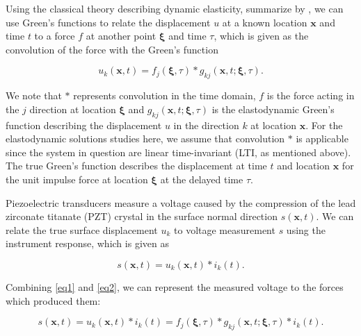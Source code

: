\documentclass[preprint,3p, 11pt,authoryear]{elsarticle}
\begin{document}
Using the classical theory describing dynamic elasticity, summarize by \citet{Aki2002}, we can use Green's functions to relate the displacement $u$ at a known location $\mathbf{x}$ and time $t$ to a force $f$ at another point $\mathbf{\xi}$ and time $\tau$, which is given as the convolution of the force with the Green's function

\begin{equation}
\label{eq1}
           u_{k}\left( \mathbf{x}, t \right)  =  
            f_{j}\left( \mathbf{\xi}, \tau \right) \ast 
            g_{kj}\left( \mathbf{x}, t;\mathbf{\xi}, \tau \right).
\end{equation}

\noindent We note that $\ast$ represents convolution in the time domain, $f$ is the force acting in the $j$ direction at location $\mathbf{\xi}$ and $g_{kj}\left( \mathbf{x}, t;\mathbf{\xi}, \tau \right)$ is the elastodynamic Green's function describing the displacement $u$ in the direction $k$ at location $\mathbf{x}$. For the elastodynamic solutions studies here, we assume that convolution $\ast$ is applicable since the system in question are linear time-invariant (LTI, as mentioned above). The true Green's function describes the displacement at time $t$ and location $\mathbf{x}$ for the unit impulse force at location $\mathbf{\xi}$ at the delayed time $\tau$. 

Piezoelectric transducers measure a voltage caused by the compression of the lead zirconate titanate (PZT) crystal in the surface normal direction $s\left( \mathbf{x}, t \right)$. We can relate the true surface displacement $u_{k}$ to voltage measurement $s$ using the instrument response, which is given as

    \begin{equation}
    \label{eq2}
        s\left( \mathbf{x}, t \right) =
            u_{k}\left( \mathbf{x}, t \right) \ast i_{k}\left(t \right).
    \end{equation}

\noindent Combining \eqref{eq1} and \eqref{eq2}, we can represent the measured voltage to the forces which produced them:

    \begin{equation}
    \label{eq3}
        s\left( \mathbf{x}, t \right) =
            u_{k}\left( \mathbf{x}, t \right) \ast i_{k}\left(t \right) =  
                f_{j}\left( \mathbf{\xi}, \tau \right) \ast 
                g_{kj}\left( \mathbf{x}, t;\mathbf{\xi}, \tau \right) \ast i_{k}\left( t \right).
    \end{equation}
\end{document}
